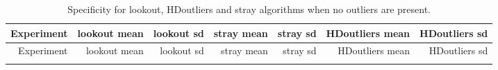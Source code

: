 \documentclass[
]{article}
\begin{document}
\begin{longtable}[]{@{}rrrrrrr@{}}
\caption{Specificity for lookout, HDoutliers and stray algorithms when
no outliers are present.}\tabularnewline
\toprule
\begin{minipage}[b]{0.10\columnwidth}\raggedleft
Experiment\strut
\end{minipage} & \begin{minipage}[b]{0.12\columnwidth}\raggedleft
lookout mean\strut
\end{minipage} & \begin{minipage}[b]{0.10\columnwidth}\raggedleft
lookout sd\strut
\end{minipage} & \begin{minipage}[b]{0.10\columnwidth}\raggedleft
stray mean\strut
\end{minipage} & \begin{minipage}[b]{0.09\columnwidth}\raggedleft
stray sd\strut
\end{minipage} & \begin{minipage}[b]{0.15\columnwidth}\raggedleft
HDoutliers mean\strut
\end{minipage} & \begin{minipage}[b]{0.13\columnwidth}\raggedleft
HDoutliers sd\strut
\end{minipage}\tabularnewline
\midrule
\endfirsthead
\toprule
\begin{minipage}[b]{0.10\columnwidth}\raggedleft
Experiment\strut
\end{minipage} & \begin{minipage}[b]{0.12\columnwidth}\raggedleft
lookout mean\strut
\end{minipage} & \begin{minipage}[b]{0.10\columnwidth}\raggedleft
lookout sd\strut
\end{minipage} & \begin{minipage}[b]{0.10\columnwidth}\raggedleft
stray mean\strut
\end{minipage} & \begin{minipage}[b]{0.09\columnwidth}\raggedleft
stray sd\strut
\end{minipage} & \begin{minipage}[b]{0.15\columnwidth}\raggedleft
HDoutliers mean\strut
\end{minipage} & \begin{minipage}[b]{0.13\columnwidth}\raggedleft
HDoutliers sd\strut
\end{minipage}\tabularnewline
\midrule
\endhead
\begin{minipage}[t]{0.10\columnwidth}\raggedleft

\end{minipage}
\end{longtable}
\end{document}
